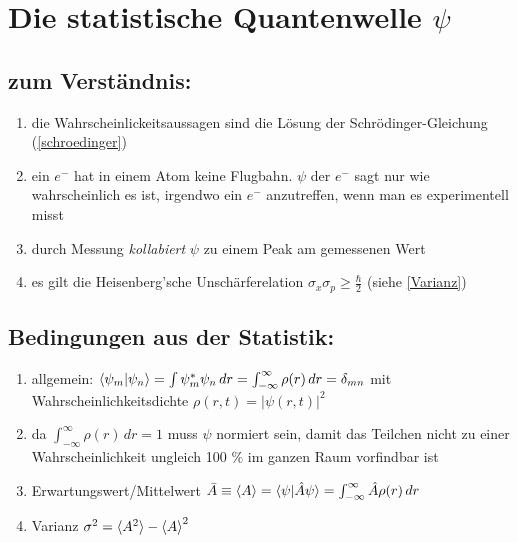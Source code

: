 \section{Die statistische Quantenwelle $\psi$}

\subsection{zum Verständnis:}
\begin{enumerate}
    \item die Wahrscheinlickeitsaussagen sind die Lösung der Schrödinger-Gleichung (\ref{schroedinger})
    \item ein $e^-$ hat in einem Atom keine Flugbahn. $\psi$ der $e^-$ sagt nur wie wahrscheinlich es ist,
    irgendwo ein $e^-$  anzutreffen, wenn man es experimentell misst
    \item durch Messung \textit{kollabiert} $\psi$ zu einem Peak am gemessenen Wert 
    \item es gilt die Heisenberg'sche Unschärferelation $\sigma_x\sigma_p\geq\frac{\hbar}{2}$ (siehe \ref{Varianz})
\end{enumerate}

\subsection{Bedingungen aus der Statistik:}
\begin{enumerate}
    \item allgemein: $\braket{\psi_m|\psi_n}=\int \psi_m^*\psi_n \,dr=\int_{-\infty}^{\infty}\rho(r)\,dr=\delta_{mn}$ 
    mit Wahrscheinlichkeitsdichte $\rho(r,t)=|\psi(r,t)|^2$
    \item da $\int_{-\infty}^{\infty} \rho(r) \,dr=1$ muss $\psi$ normiert sein, damit 
    das Teilchen nicht zu einer Wahrscheinlichkeit ungleich 100 $\%$ im ganzen Raum vorfindbar ist \label{normiert}
    \item Erwartungswert/Mittelwert $\bar{A}\equiv\braket{A}=\braket{\psi|\hat{A}\psi}=\int_{-\infty}^{\infty}\hat{A}\rho(r)\,dr$
    \item Varianz $\sigma^2=\braket{A^2}-\braket{A}^2$ \label{Varianz}
\end{enumerate}

